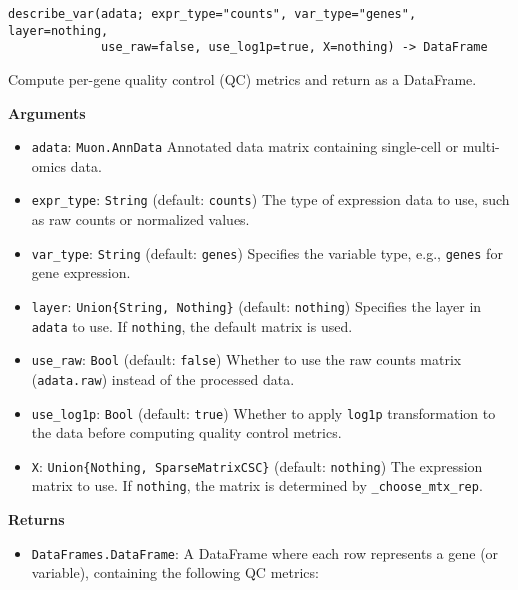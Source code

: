 \documentclass[oneside]{memoir}
\begin{document}
\begin{adjustwidth}{2em}{0pt}


\begin{verbatim}
describe_var(adata; expr_type="counts", var_type="genes", layer=nothing, 
             use_raw=false, use_log1p=true, X=nothing) -> DataFrame
\end{verbatim}

Compute per-gene quality control (QC) metrics and return as a DataFrame.

\textbf{Arguments}

\begin{itemize}
\item \texttt{adata}: \texttt{Muon.AnnData}   Annotated data matrix containing single-cell or multi-omics data.


\item \texttt{expr\_type}: \texttt{String} (default: \texttt{{\textquotedbl}counts{\textquotedbl}})   The type of expression data to use, such as raw counts or normalized values.


\item \texttt{var\_type}: \texttt{String} (default: \texttt{{\textquotedbl}genes{\textquotedbl}})   Specifies the variable type, e.g., \texttt{{\textquotedbl}genes{\textquotedbl}} for gene expression.


\item \texttt{layer}: \texttt{Union\{String, Nothing\}} (default: \texttt{nothing})   Specifies the layer in \texttt{adata} to use. If \texttt{nothing}, the default matrix is used.


\item \texttt{use\_raw}: \texttt{Bool} (default: \texttt{false})   Whether to use the raw counts matrix (\texttt{adata.raw}) instead of the processed data.


\item \texttt{use\_log1p}: \texttt{Bool} (default: \texttt{true})   Whether to apply \texttt{log1p} transformation to the data before computing quality control metrics.


\item \texttt{X}: \texttt{Union\{Nothing, SparseMatrixCSC\}} (default: \texttt{nothing})   The expression matrix to use. If \texttt{nothing}, the matrix is determined by \texttt{\_choose\_mtx\_rep}.

\end{itemize}
\textbf{Returns}

\begin{itemize}
\item \texttt{DataFrames.DataFrame}:   A DataFrame where each row represents a gene (or variable), containing the following QC metrics:


\end{itemize}
\end{adjustwidth}
\end{document}
